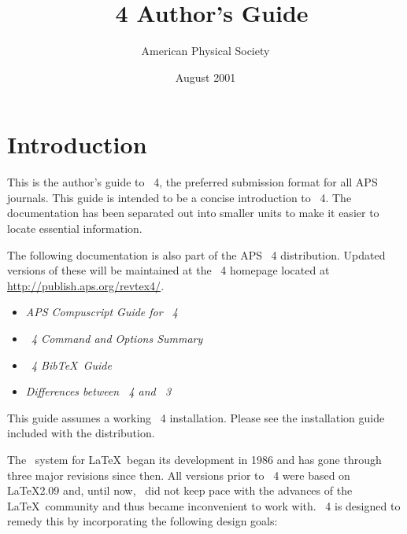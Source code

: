 \documentclass[%
 ,twocolumn%
 ,secnumarabic%
,amssymb, amsmath,nobibnotes, aps, prl]{revtex4}
\begin{document}
\title{\revtex~4 Author's Guide}%

\author{American Physical Society}%
\date{August 2001}%
\maketitle
\tableofcontents

\section{Introduction}

This is the author's guide to \revtex~4, the preferred submission
format for all APS journals. This guide is intended to be a concise
introduction to \revtex~4. The documentation has been separated out
into smaller units to make it easier to locate essential
information.

The following documentation is also part of the APS \revtex~4
distribution. Updated versions of these will be maintained at
the \revtex~4 homepage located at \url{http://publish.aps.org/revtex4/}.
\begin{itemize}
\item \textit{APS Compuscript Guide for \revtex~4}
\item \textit{\revtex~4 Command and Options Summary}
\item \textit{\revtex~4 Bib\TeX\ Guide}
\item \textit{Differences between \revtex~4 and \revtex~3}
\end{itemize}
This guide assumes a working \revtex~4
installation. Please see the installation guide included with the
distribution.

The \revtex\ system for \LaTeX\ began its development in 1986 and has
gone through three major revisions since then.  All versions prior to
\revtex~4 were based on \LaTeX2.09 and, until now, \revtex\ did not
keep pace with the advances of the \LaTeX\ community and thus became
inconvenient to work with. \revtex~4 is designed to remedy this by
incorporating the following design goals:
\end{document}
